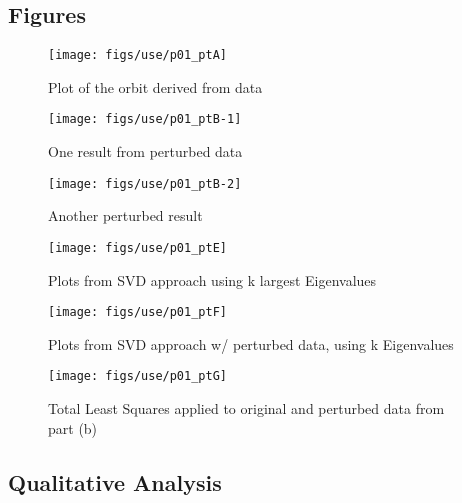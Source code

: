 \documentclass[paper=a4, fontsize=11pt]{scrartcl}
\numberwithin{equation}{section}		%
\numberwithin{figure}{section}			%
\numberwithin{table}{section}				%
\begin{document}
\vspace{4mm}
\subsection{Figures}

\begin{figure}[!hbt]
		\texttt{[image: figs/use/p01\_ptA]}
		\caption{Plot of the orbit derived from data}
		\label{fig:3.5-a}
	\endminipage\hfill
		\texttt{[image: figs/use/p01\_ptB-1]}
		\caption{One result from perturbed data}
		\label{fig:p3.5-b1}
	\endminipage\hfill
		\texttt{[image: figs/use/p01\_ptB-2]}
		\caption{Another perturbed result}
		\label{fig:p3.5-b2}
	\endminipage\hfill
\end{figure}
\begin{figure}[!hbt]
		\texttt{[image: figs/use/p01\_ptE]}
		\caption{Plots from SVD approach using k largest Eigenvalues}
		\label{fig:3.5-e}
	\endminipage\hfill
		\texttt{[image: figs/use/p01\_ptF]}
		\caption{Plots from SVD approach w/ perturbed data, using k Eigenvalues}
		\label{fig:3.5-f}
	\endminipage\hfill
\end{figure}
\begin{figure}[!hbt]
	\texttt{[image: figs/use/p01\_ptG]}
	\caption{Total Least Squares applied to original and perturbed data from part (b)}
	\label{fig:3.5-g}
	\endminipage\hfill
\end{figure}

\vspace{4mm}
\subsection{Qualitative Analysis}
\end{document}
